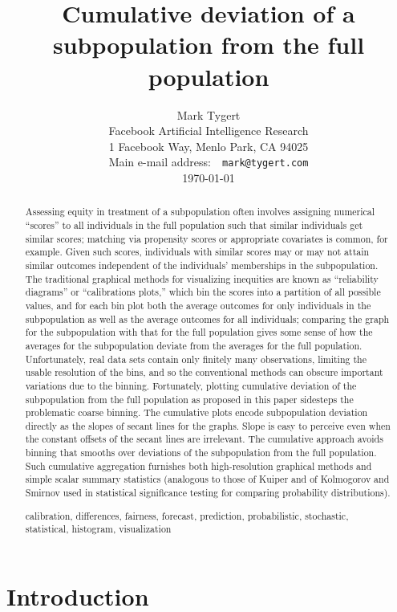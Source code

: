 \documentclass{article}
\title{Cumulative deviation of a subpopulation from the full population}
\author{Mark Tygert\\{\normalsize Facebook Artificial Intelligence Research}\\
{\normalsize 1 Facebook Way, Menlo Park, CA 94025}\\
{\normalsize Main e-mail address:\ \ {\tt mark@tygert.com}}\\
{\normalsize \today}}
\date{\vspace{-.25in}}
\begin{document}
\maketitle



\begin{abstract}
Assessing equity in treatment of a subpopulation often involves assigning
numerical ``scores'' to all individuals in the full population such that
similar individuals get similar scores; matching via propensity scores
or appropriate covariates is common, for example. Given such scores,
individuals with similar scores may or may not attain similar outcomes
independent of the individuals' memberships in the subpopulation.
The traditional graphical methods for visualizing inequities are known as
``reliability diagrams'' or ``calibrations plots,'' which bin the scores
into a partition of all possible values, and for each bin plot
both the average outcomes for only individuals in the subpopulation
as well as the average outcomes for all individuals; comparing the graph
for the subpopulation with that for the full population gives some sense
of how the averages for the subpopulation deviate from the averages
for the full population. Unfortunately, real data sets contain
only finitely many observations, limiting the usable resolution of the bins,
and so the conventional methods can obscure important variations
due to the binning. Fortunately, plotting cumulative deviation
of the subpopulation from the full population as proposed in this paper
sidesteps the problematic coarse binning.
The cumulative plots encode subpopulation deviation directly
as the slopes of secant lines for the graphs.
Slope is easy to perceive even when the constant offsets of the secant lines
are irrelevant. The cumulative approach avoids binning that smooths over
deviations of the subpopulation from the full population.
Such cumulative aggregation furnishes both high-resolution graphical methods
and simple scalar summary statistics (analogous to those
of Kuiper and of Kolmogorov and Smirnov used
in statistical significance testing for comparing probability distributions).

\medskip

 calibration, differences, fairness, forecast,
prediction, probabilistic, stochastic, statistical, histogram, visualization
\end{abstract}



\section{Introduction}
\label{intro}
\end{document}
